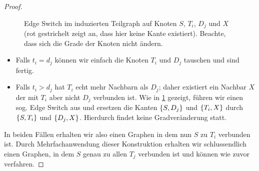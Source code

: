 \begin{proof}
\begin{figure}
\begin{center}
        \end{center}
        \caption{
            Edge Switch im induzierten Teilgraph auf Knoten $S$, $T_i$, $D_j$ und $X$
            (rot gestrichelt zeigt an, dass hier keine Kante existiert).
            Beachte, dass sich die Grade der Knoten nicht ändern.
        }
        \label{fig:hh_edge_switch}
    \end{figure}

    \begin{itemize}
        \item
              Falls $t_i = d_j$ können wir einfach die Knoten $T_i$ und $D_j$ tauschen und sind fertig.
        \item
              Falls $t_i > d_j$ hat $T_i$ echt mehr Nachbarn als $D_j$; daher existiert ein Nachbar $X$ der mit $T_i$ aber nicht $D_j$ verbunden ist.
              Wie in \cref{fig:hh_edge_switch} gezeigt, führen wir einen sog. Edge Switch aus und ersetzen die Kanten $\left\{S, D_j\right\}$ und $\left\{T_i, X\right\}$ durch $\left\{S, T_i\right\}$ und $\left\{D_j, X\right\}$.
              Hierdurch findet keine Gradveränderung statt.
    \end{itemize}

    In beiden Fällen erhalten wir also einen Graphen in dem nun $S$ zu $T_i$ verbunden ist.
    Durch Mehrfachanwendung dieser Konstruktion erhalten wir schlussendlich einen Graphen, in  dem $S$ genau zu allen $T_j$ verbunden ist und können wie zuvor verfahren.
\end{proof}